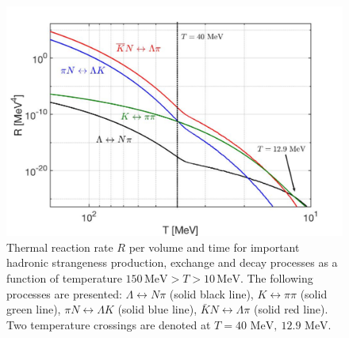 \documentclass[universe,article,submit,moreauthors,pdftex,a4paper]{Definitions/mdpi}
\newcommand{\MeV}{\text{ MeV}}
\begin{document}
\begin{figure}[ht]
\centering
\includegraphics[width=\linewidth]{./plots/NewHyperonRate_CTYang.jpg}
\caption{Thermal reaction rate $R$ per volume and time for important hadronic strangeness production, exchange and decay processes as a function of temperature $150\,\mathrm{MeV}> T>10\,\mathrm{MeV}$. The following processes are presented: $\Lambda\leftrightarrow N\pi$ (solid black line), $K\leftrightarrow\pi\pi$ (solid green line), $\pi N\leftrightarrow\Lambda K$ (solid blue line), $\bar K N\leftrightarrow\Lambda\pi$ (solid red line). Two temperature crossings are denoted at $T=40\MeV,\ 12.9\MeV$.}
\label{Lambda_Rate_volume.fig}
\end{figure}
\end{document}
